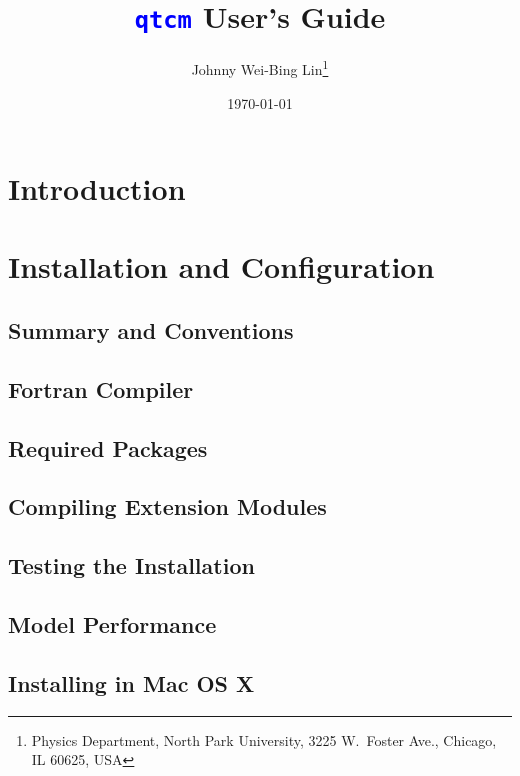 \documentclass[12pt]{book}
\newcommand{\mods}[1]{\textcolor{blue}{\texttt{#1}}}
\begin{document}
    

    
%
\title{\mods{qtcm} User's Guide}
\author{Johnny Wei-Bing Lin\thanks{Physics Department, North Park University,
	3225 W.\ Foster Ave., Chicago, IL  60625, USA}}
\date{\today}
\maketitle
\tableofcontents




%
\chapter{Introduction}


\chapter{Installation and Configuration}    \label{ch:install}
	\section{Summary and Conventions}      \label{sec:install.sum}
	
	\section{Fortran Compiler}             \label{sec:fort.compilers}
	
	\section{Required Packages}            \label{sec:py.etc.pkgs}
	
	\section{Compiling Extension Modules}  \label{sec:create.so}
	
	\section{Testing the Installation}     \label{sec:test.qtcm}
	
	\section{Model Performance}
	
	\section{Installing in Mac OS X}       \label{sec:install.macosx}
	
\end{document}
